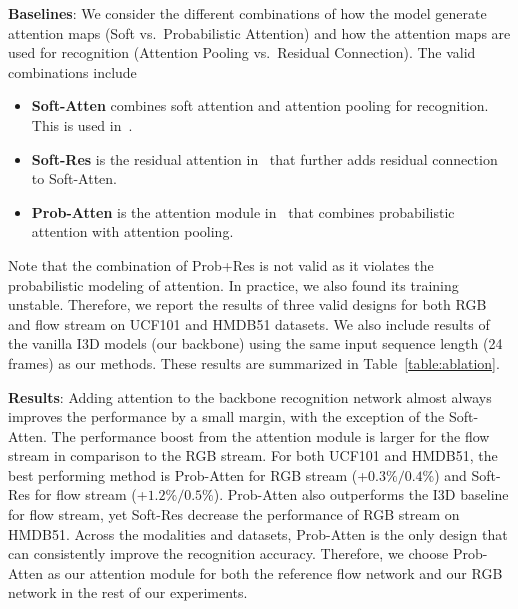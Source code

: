 \documentclass[10pt,twocolumn,letterpaper]{article}
\begin{document}
\noindent \textbf{Baselines}: We consider the different combinations of how the model generate attention maps (Soft vs.\ Probabilistic Attention) and how the attention maps are used for recognition (Attention Pooling vs.\ Residual Connection). The valid combinations include
\begin{itemize}
    \item \textbf{Soft-Atten} combines soft attention and attention pooling for recognition. This is used in~\cite{liu2018end}.
    \item \textbf{Soft-Res} is the residual attention in~\cite{wang2017residual} that further adds residual connection to Soft-Atten.
    \item \textbf{Prob-Atten} is the attention module in~\cite{Li_2018_ECCV} that combines probabilistic attention with attention pooling.
\end{itemize}

Note that the combination of Prob+Res is not valid as it violates the probabilistic modeling of attention. In practice, we also found its training unstable. Therefore, we report the results of three valid designs for both RGB and flow stream on UCF101 and HMDB51 datasets. We also include results of the vanilla I3D models (our backbone) using the same input sequence length (24 frames) as our methods. These results are summarized in Table~\ref{table:ablation}.

\noindent \textbf{Results}: Adding attention to the backbone recognition network almost always improves the performance by a small margin, with the exception of the Soft-Atten. The performance boost from the attention module is larger for the flow stream in comparison to the RGB stream. For both UCF101 and HMDB51, the best performing method is Prob-Atten for RGB stream (+$0.3\%/0.4\%$) and Soft-Res for flow stream (+$1.2\%/0.5\%$). Prob-Atten also outperforms the I3D baseline for flow stream, yet Soft-Res decrease the performance of RGB stream on HMDB51. Across the modalities and datasets, Prob-Atten is the only design that can consistently improve the recognition accuracy. Therefore, we choose Prob-Atten as our attention module for both the reference flow network and our RGB network in the rest of our experiments. 
\end{document}
